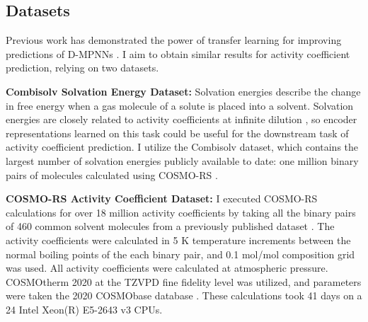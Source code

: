 


\subsection{Datasets}

Previous work has demonstrated the power of transfer learning for improving predictions of D-MPNNs \cite{Vermeire2021}. I aim to obtain similar results for activity coefficient prediction, relying on two datasets.

\noindent
\textbf{Combisolv Solvation Energy Dataset:} Solvation energies describe the change in free energy when a gas molecule of a solute is placed into a solvent. Solvation energies are closely related to activity coefficients at infinite dilution \cite{Moine2017}, so encoder representations learned on this task could be useful for the downstream task of activity coefficient prediction. I utilize the Combisolv dataset, which contains the largest number of solvation energies publicly available to date: one million binary pairs of molecules calculated using COSMO-RS \cite{Vermeire2021}.

\noindent
\textbf{COSMO-RS Activity Coefficient Dataset:} I executed COSMO-RS calculations for over 18 million activity coefficients by taking all the binary pairs of 460 common solvent molecules from a previously published dataset \cite{Amar2019}. The activity coefficients were calculated in 5 K temperature increments between the normal boiling points of the each binary pair, and 0.1 mol/mol composition grid was used. All activity coefficients were calculated at atmospheric pressure. COSMOtherm 2020 at the TZVPD fine fidelity level was utilized, and parameters were taken the 2020 COSMObase database \cite{Klamt2010}. These calculations took 41 days on a 24 Intel Xeon(R) E5-2643 v3 CPUs. 



